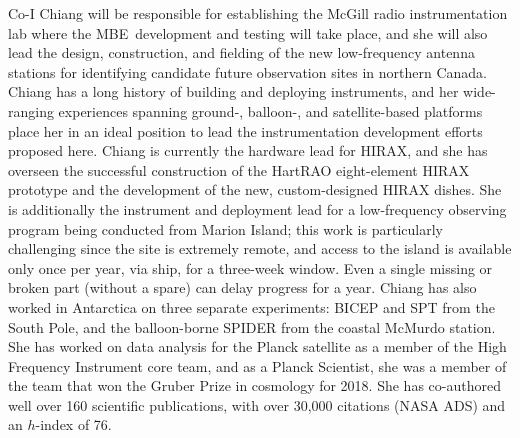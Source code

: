 \documentclass[letterpaper,11pt,preprint]{aastex}
\newcommand{\mbe}{{\rm MBE}}
\begin{document}
Co-I Chiang will be responsible for establishing the McGill radio
instrumentation lab where the \mbe\ development and testing will take
place, and she will also lead the design, construction, and fielding
of the new low-frequency antenna stations for identifying candidate
future observation sites in northern Canada.  Chiang has a long
history of building and deploying instruments, and her wide-ranging
experiences spanning ground-, balloon-, and satellite-based platforms
place her in an ideal position to lead the instrumentation development
efforts proposed here.  Chiang is currently the hardware lead for
HIRAX, and she has overseen the successful construction of the HartRAO
eight-element HIRAX prototype and the development of the new,
custom-designed HIRAX dishes.  She is additionally the instrument and
deployment lead for a low-frequency observing program being conducted
from Marion Island; this work is particularly challenging since the
site is extremely remote, and access to the island is available only
once per year, via ship, for a three-week window.  Even a single
missing or broken part (without a spare) can delay progress for a
year.  Chiang has also worked in Antarctica on three separate
experiments: BICEP and SPT from the South Pole, and the balloon-borne
SPIDER from the coastal McMurdo station.  She has worked on data
analysis for the Planck satellite as a member of the High Frequency
Instrument core team, and as a Planck Scientist, she was a member of
the team that won the Gruber Prize in cosmology for 2018.  She has
co-authored well over 160 scientific publications, with over 30,000
citations (NASA ADS) and an $h$-index of 76.
\end{document}
